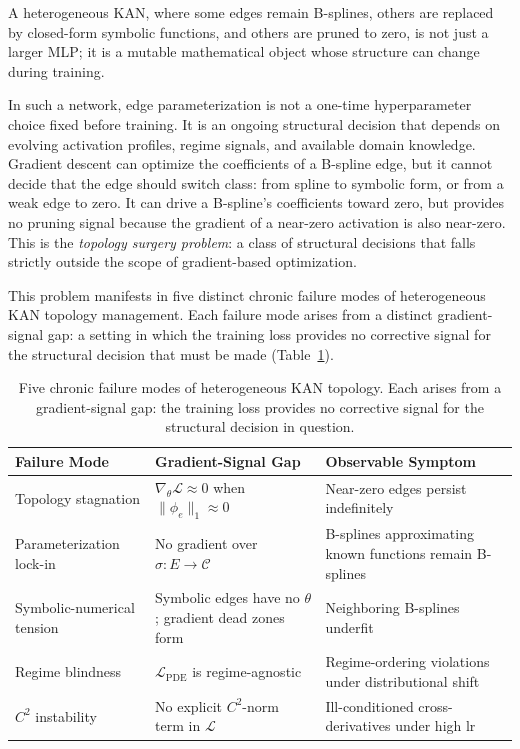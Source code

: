 \documentclass[11pt,a4paper]{article}
\begin{document}
A heterogeneous KAN, where some edges remain B-splines, others are replaced by
closed-form symbolic functions, and others are pruned to zero, is not just a larger
MLP; it is a mutable mathematical object whose structure can change during training.

In such a network, edge parameterization is not a one-time hyperparameter choice
fixed before training. It is an ongoing structural decision that depends on evolving
activation profiles, regime signals, and available domain knowledge. Gradient descent
can optimize the coefficients of a B-spline edge, but it cannot decide that the edge
should switch class: from spline to symbolic form, or from a weak edge to zero. It
can drive a B-spline's coefficients toward zero, but provides no pruning signal
because the gradient of a near-zero activation is also near-zero. This is the
\emph{topology surgery problem}: a class of structural decisions that falls strictly
outside the scope of gradient-based optimization.

This problem manifests in five distinct chronic failure modes of heterogeneous KAN
topology management. Each failure mode arises from a distinct gradient-signal gap:
a setting in which the training loss provides no corrective signal for the structural
decision that must be made (Table~\ref{tab:problems}).

\begin{table}[ht]
\centering
\caption{Five chronic failure modes of heterogeneous KAN topology. Each arises from
a gradient-signal gap: the training loss provides no corrective signal for the
structural decision in question.}
\begin{tabular}{@{}p{3.2cm}p{4.5cm}p{4.5cm}@{}}
\toprule
Failure Mode & Gradient-Signal Gap & Observable Symptom \\
\midrule
Topology stagnation & $\nabla_\theta \mathcal{L} \approx 0$ when $\|\phi_e\|_1 \approx 0$ & Near-zero edges persist indefinitely \\
Parameterization lock-in & No gradient over $\sigma: E \to \mathcal{C}$ & B-splines approximating known functions remain B-splines \\
Symbolic-numerical tension & Symbolic edges have no $\theta$; gradient dead zones form & Neighboring B-splines underfit \\
Regime blindness & $\mathcal{L}_\text{PDE}$ is regime-agnostic & Regime-ordering violations under distributional shift \\
$C^2$ instability & No explicit $C^2$-norm term in $\mathcal{L}$ & Ill-conditioned cross-derivatives under high lr \\
\bottomrule
\end{tabular}
\label{tab:problems}
\end{table}
\end{document}
